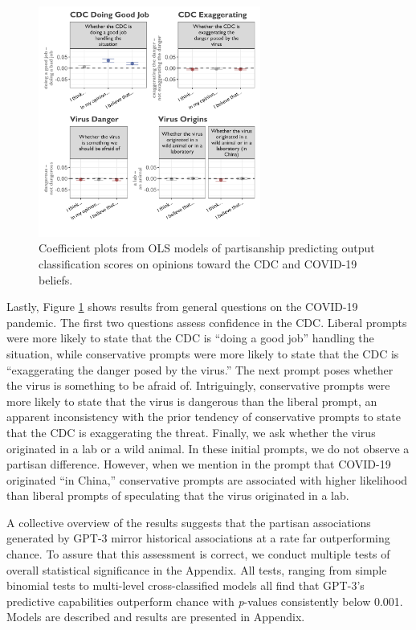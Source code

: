 \documentclass{article} %
\begin{document}
\begin{figure}[!htbp]
  \captionsetup{justification=raggedright,singlelinecheck=false}
  \caption{Coefficient plots from OLS models of partisanship predicting output classification scores on opinions toward the CDC and COVID-19 beliefs.}
  \label{fig:partisan4}
  \centering
  \includegraphics[width=0.65\textwidth]{./figures/media/image8.png}
\end{figure}

Lastly, Figure \ref{fig:partisan4} shows results from general questions on the COVID-19
pandemic. The first two questions assess confidence in the CDC. Liberal
prompts were more likely to state that the CDC is ``doing a good job''
handling the situation, while conservative prompts were more likely to
state that the CDC is ``exaggerating the danger posed by the virus.''
The next prompt poses whether the virus is something to be afraid of.
Intriguingly, conservative prompts were more likely to state that the
virus is dangerous than the liberal prompt, an apparent inconsistency
with the prior tendency of conservative prompts to state that the CDC is
exaggerating the threat. Finally, we ask whether the virus originated in
a lab or a wild animal. In these initial prompts, we do not observe a
partisan difference. However, when we mention in the prompt that
COVID-19 originated ``in China,'' conservative prompts are associated
with higher likelihood than liberal prompts of speculating that the
virus originated in a lab.

A collective overview of the results suggests that the partisan
associations generated by GPT-3 mirror historical associations at a rate
far outperforming chance. To assure that this assessment is correct, we
conduct multiple tests of overall statistical significance in the
Appendix. All tests, ranging from simple binomial tests to multi-level
cross-classified models all find that GPT-3's predictive capabilities
outperform chance with \emph{p}-values consistently below 0.001. Models
are described and results are presented in Appendix.
\end{document}
